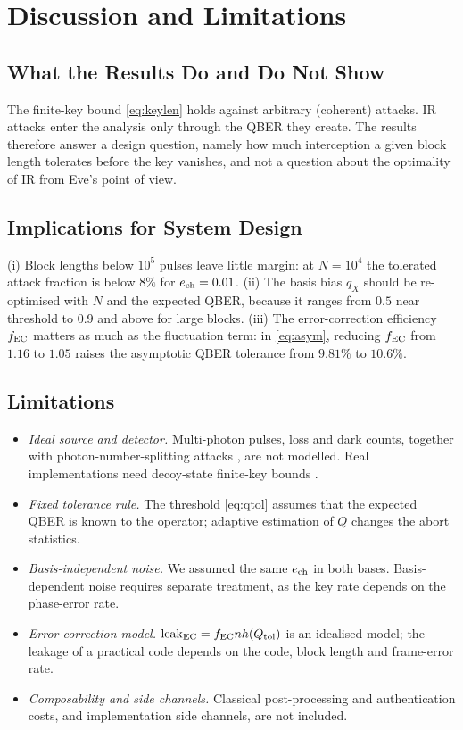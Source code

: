 \section{Discussion and Limitations}\label{sec:discussion}

\subsection{What the Results Do and Do Not Show}
The finite-key bound \eqref{eq:keylen} holds against arbitrary (coherent) attacks. IR attacks enter the analysis only through the QBER they create. The results therefore answer a design question, namely how much interception a given block length tolerates before the key vanishes, and not a question about the optimality of IR from Eve's point of view.

\subsection{Implications for System Design}
(i) Block lengths below $10^5$ pulses leave little margin: at $N=10^4$ the tolerated attack fraction is below $8\%$ for $e_{\mathrm{ch}}=0.01$. (ii) The basis bias $q_X$ should be re-optimised with $N$ and the expected QBER, because it ranges from $0.5$ near threshold to $0.9$ and above for large blocks. (iii) The error-correction efficiency $f_{\mathrm{EC}}$ matters as much as the fluctuation term: in \eqref{eq:asym}, reducing $f_{\mathrm{EC}}$ from $1.16$ to $1.05$ raises the asymptotic QBER tolerance from $9.81\%$ to $10.6\%$.

\subsection{Limitations}
\begin{itemize}
\item \emph{Ideal source and detector.} Multi-photon pulses, loss and dark counts, together with photon-number-splitting attacks \cite{Brassard00,GLLP04}, are not modelled. Real implementations need decoy-state finite-key bounds \cite{Lim14}.
\item \emph{Fixed tolerance rule.} The threshold \eqref{eq:qtol} assumes that the expected QBER is known to the operator; adaptive estimation of $Q$ changes the abort statistics.
\item \emph{Basis-independent noise.} We assumed the same $e_{\mathrm{ch}}$ in both bases. Basis-dependent noise requires separate treatment, as the key rate depends on the phase-error rate.
\item \emph{Error-correction model.} $\mathrm{leak}_{\mathrm{EC}}=f_{\mathrm{EC}} nh(Q_{\mathrm{tol}})$ is an idealised model; the leakage of a practical code depends on the code, block length and frame-error rate.
\item \emph{Composability and side channels.} Classical post-processing and authentication costs, and implementation side channels, are not included.
\end{itemize}

